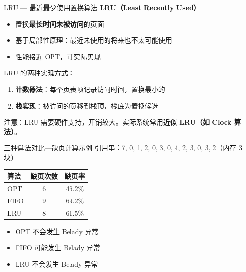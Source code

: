 \documentclass[10pt, aspectratio=169]{beamer}
\begin{document}
\begin{frame}{LRU --- 最近最少使用置换算法}
    \textbf{LRU（Least Recently Used）}
    \begin{itemize}
        \item 置换\textbf{最长时间未被访问}的页面
        \item 基于局部性原理：最近未使用的将来也不太可能使用
        \item 性能接近 OPT，可实际实现
    \end{itemize}
    \vspace{0.5em}
    LRU 的两种实现方式：
    \begin{enumerate}
        \item \textbf{计数器法}：每个页表项记录访问时间，置换最小的
        \item \textbf{栈实现}：被访问的页移到栈顶，栈底为置换候选
    \end{enumerate}
    \vspace{0.5em}
    注意：LRU 需要硬件支持，开销较大。实际系统常用\textbf{近似 LRU（如 Clock 算法）}。
\end{frame}

\begin{frame}{三种算法对比---缺页计算示例}
    引用串：7, 0, 1, 2, 0, 3, 0, 4, 2, 3, 0, 3, 2（内存 3 块）

    \vspace{0.5em}
    \begin{center}
        \begin{tabular}{|l|c|c|}
            \hline
            \textbf{算法} & \textbf{缺页次数} & \textbf{缺页率} \\
            \hline
            OPT & 6 & 46.2\% \\
            FIFO & 9 & 69.2\% \\
            LRU & 8 & 61.5\% \\
            \hline
        \end{tabular}
    \end{center}
    \vspace{0.5em}
    \begin{itemize}
        \item OPT 不会发生 Belady 异常
        \item FIFO 可能发生 Belady 异常
        \item LRU 不会发生 Belady 异常
    \end{itemize}
\end{frame}
\end{document}
